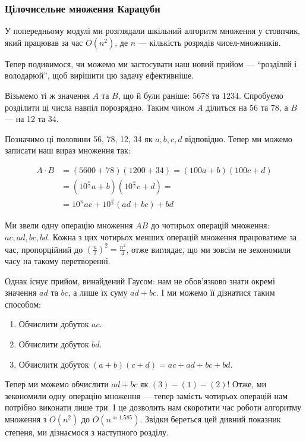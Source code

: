 \documentclass[12pt,a4paper]{report}
\begin{document}
\subsubsection*{Цілочисельне множення Карацуби}

У попередньому модулі ми розглядали шкільний алгоритм множення у стовпчик, який працював за час \(O(n^2)\), де \(n\) --- кількість розрядів чисел-множників.

Тепер подивимося, чи можемо ми застосувати наш новий прийом --- ``розділяй і володарюй'', щоб вирішити цю задачу ефективніше.

Візьмемо ті ж значення \(A\) та \(B\), що й були раніше: 5678 та 1234. Спробуємо розділити ці числа навпіл порозрядно. Таким чином \(A\) ділиться на 56 та 78, а \(B\) --- на 12 та 34.

Позначимо ці половини 56, 78, 12, 34 як \(a, b, c, d\) відповідно. Тепер ми можемо записати наш вираз множення так:

\begin{align*}
A \cdot B
& = (5600 + 78)(1200 + 34)
= (100a + b)(100c + d) \\
& = (10 ^ {\frac{n}{2}} a + b)(10 ^ {\frac{n}{2}} c + d) = \\
& = 10 ^ n a c + 10 ^ {\frac{n}{2}}(ad + bc) + bd
\end{align*}

Ми звели одну операцію множення \(AB\) до чотирьох операцій множення: \(ac, ad, bc, bd\). Кожна з цих чотирьох менших операцій множення працюватиме за час, пропорційний до \((\frac{n}{2})^2 = \frac{n^2}{4} \), отже виглядає, що ми зовсім не зекономили часу на такому перетворенні.

Однак існує прийом, винайдений Гаусом: нам не обов’язково знати окремі значення \(ad\) та \(bc\), а лише їх суму \(ad + bc\). І ми можемо її дізнатися таким способом:

\begin{enumerate}
    \item Обчислити добуток \(ac\).
    \item Обчислити добуток \(bd\).
    \item Обчислити добуток \((a + b)(c + d) = ac + ad + bc + bd\).
\end{enumerate}

Тепер ми можемо обчислити \(ad + bc\) як \((3) - (1) - (2)\)!
Отже, ми зекономили одну операцію множення --- тепер замість чотирьох операцій нам потрібно виконати лише три. І це дозволить нам скоротити час роботи алгоритму множення з \(O(n ^ 2)\) до \(O(n ^ {\approx 1.585})\). Звідки береться цей дивний показник степеня, ми дізнаємося з наступного розділу.
\end{document}
